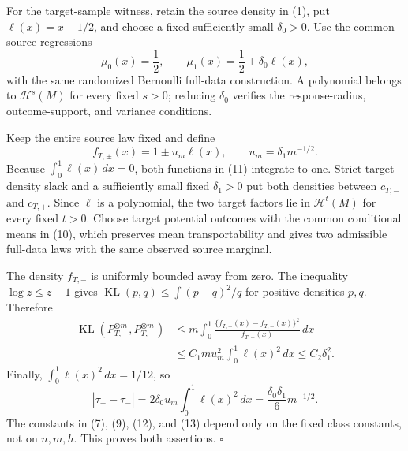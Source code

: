 For the target-sample witness, retain the source density in (1), put \(\ell(x)=x-1/2\), and choose a fixed sufficiently small \(\delta_0>0\).  Use the common source regressions
\[
\mu_0(x)=\frac12,
\qquad
\mu_1(x)=\frac12+\delta_0\ell(x),
\tag{10}
\]
with the same randomized Bernoulli full-data construction.  A polynomial belongs to \(\mathcal H^s(M)\) for every fixed \(s>0\); reducing \(\delta_0\) verifies the response-radius, outcome-support, and variance conditions.

Keep the entire source law fixed and define
\[
f_{T,\pm}(x)=1\pm u_m\ell(x),
\qquad
u_m=\delta_1m^{-1/2}.
\tag{11}
\]
Because \(\int_0^1\ell(x)\,dx=0\), both functions in (11) integrate to one.  Strict target-density slack and a sufficiently small fixed \(\delta_1>0\) put both densities between \(c_{T,-}\) and \(c_{T,+}\).  Since \(\ell\) is a polynomial, the two target factors lie in \(\mathcal H^t(M)\) for every fixed \(t>0\).  Choose target potential outcomes with the common conditional means in (10), which preserves mean transportability and gives two admissible full-data laws with the same observed source marginal.

The density \(f_{T,-}\) is uniformly bounded away from zero.  The inequality \(\log z\le z-1\) gives \(\operatorname{KL}(p,q)\le\int(p-q)^2/q\) for positive densities \(p,q\).  Therefore
\[
\begin{aligned}
\operatorname{KL}(P_{T,+}^{\otimes m},P_{T,-}^{\otimes m})
&\le m\int_0^1
\frac{\{f_{T,+}(x)-f_{T,-}(x)\}^2}{f_{T,-}(x)}\,dx\\
&\le C_1mu_m^2\int_0^1\ell(x)^2\,dx
\le C_2\delta_1^2.
\end{aligned}
\tag{12}
\]
Finally, \(\int_0^1\ell(x)^2\,dx=1/12\), so
\[
|\tau_+-\tau_-|
=2\delta_0u_m\int_0^1\ell(x)^2\,dx
=\frac{\delta_0\delta_1}{6}m^{-1/2}.
\tag{13}
\]
The constants in (7), (9), (12), and (13) depend only on the fixed class constants, not on \(n,m,h\).  This proves both assertions. \(\square\)